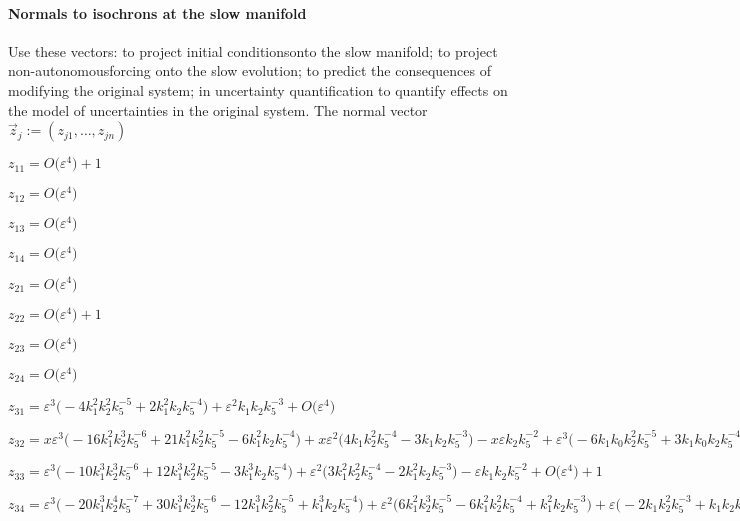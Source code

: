 \documentclass[11pt,a5paper]{article}
\def\eps{\varepsilon} \def\_{_}
\begin{document}
\paragraph{Normals to isochrons at the slow manifold}
Use these vectors: to project initial conditionsonto the slow manifold; to project non-autonomousforcing onto the slow evolution; to predict the
consequences of modifying the original system; in
uncertainty quantification to quantify effects on
the model of uncertainties in the original system.
The normal vector \(\vec z\_ j:=(z\_{j1},\ldots,z\_{jn})\)
\(
\)\par
\(z_{11}=O\big(\varepsilon ^{4}\big)+1
\)\par
\(z_{12}=O\big(\varepsilon ^{4}\big)
\)\par
\(z_{13}=O\big(\varepsilon ^{4}\big)
\)\par
\(z_{14}=O\big(\varepsilon ^{4}\big)
\)\par
\(z_{21}=O\big(\varepsilon ^{4}\big)
\)\par
\(z_{22}=O\big(\varepsilon ^{4}\big)+1
\)\par
\(z_{23}=O\big(\varepsilon ^{4}\big)
\)\par
\(z_{24}=O\big(\varepsilon ^{4}\big)
\)\par
\(z_{31}=\eps^{3} \big(-4 k_1^{2} k\_2^{2} k\_5^{-5}+2 k_1^{2} k\_2 
k\_5^{-4}\big)+\eps^{2} k_1 k\_2 k\_5^{-3}+O\big(\varepsilon ^{4}\big)
\)\par
\(z_{32}=x \eps^{3} \big(-16 k_1^{2} k\_2^{3} k\_5^{-6}+21 k_1^{2}
 k\_2^{2} k\_5^{-5}-6 k_1^{2} k\_2 k\_5^{-4}\big)+x \eps^{2} \big(
4 k_1 k\_2^{2} k\_5^{-4}-3 k_1 k\_2 k\_5^{-3}\big)-x \eps k\_2 
k\_5^{-2}+\eps^{3} \big(-6 k_1 k_0 k\_2^{2} k\_5^{-5}+3 k_1 k_0 
k\_2 k\_5^{-4}\big)+\eps^{2} k_0 k\_2 k\_5^{-3}+O\big(\varepsilon ^{4}
\big)
\)\par
\(z_{33}=\eps^{3} \big(-10 k_1^{3} k\_2^{3} k\_5^{-6}+12 k_1^{3} k\_2
^{2} k\_5^{-5}-3 k_1^{3} k\_2 k\_5^{-4}\big)+\eps^{2} \big(3 k_1^{2}
 k\_2^{2} k\_5^{-4}-2 k_1^{2} k\_2 k\_5^{-3}\big)-\eps k_1 k\_2 k\_5
^{-2}+O\big(\varepsilon ^{4}\big)+1
\)\par
\(z_{34}=\eps^{3} \big(-20 k_1^{3} k\_2^{4} k\_5^{-7}+30 k_1^{3} k\_2
^{3} k\_5^{-6}-12 k_1^{3} k\_2^{2} k\_5^{-5}+k_1^{3} k\_2 k\_5^{-4}
\big)+\eps^{2} \big(6 k_1^{2} k\_2^{3} k\_5^{-5}-6 k_1^{2} k\_2^{2} 
k\_5^{-4}+k_1^{2} k\_2 k\_5^{-3}\big)+\eps \big(-2 k_1 k\_2^{2} k\_5
^{-3}+k_1 k\_2 k\_5^{-2}\big)+O\big(\varepsilon ^{4}\big)+k\_2 k\_5^{
-1}
\)\par
\(
\)\par
\end{document}
